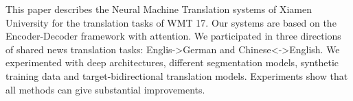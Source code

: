 This paper describes the Neural Machine Translation systems of Xiamen University for the translation tasks of WMT 17. Our systems are based on the Encoder-Decoder framework with attention. We participated in three directions of shared news translation tasks: Englis->German and Chinese<->English. We experimented with deep architectures, different segmentation models, synthetic training data and target-bidirectional translation models. Experiments show that all methods can give substantial improvements.
